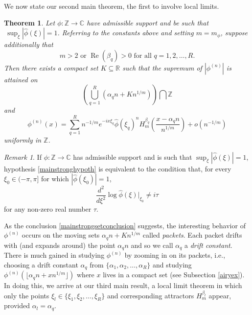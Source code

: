 \documentclass{article}
\theoremstyle{theorem}
\newtheorem{theorem}{Theorem}[section]
\theoremstyle{remark}
\newtheorem{remark}{Remark}
\renewcommand\Re{\operatorname{Re}}%
\begin{document}
\noindent We now state our second main theorem, the first to involve local limits.

\begin{theorem}\label{mainstrong}
Let $\phi:\mathbb{Z}\rightarrow \mathbb{C}$ have admissible support and be such
that $\ \sup_\xi|\hat\phi(\xi)|=1$. Referring to the constants above and setting $m=m_\phi$, suppose additionally that 
\begin{equation}\label{mainstronghypoth}
 m>2\mbox{ or }\Re(\beta_q)>0\mbox{ for all }q=1,2,\dots, R.
\end{equation}
Then there exists a compact set $K\subseteq\mathbb{R}$ such that the supremum of $|\phi^{(n)}|$ is attained on 
\begin{equation}\label{mainstrongsetconclusion}
\left(\bigcup_{q=1}^{R}(\alpha_q n+ Kn^{1/m})\right)\bigcap \mathbb{Z}
\end{equation}
 and
\begin{equation}\label{mainstrongconvergenceconclusion}
\phi^{(n)}(x)=\sum_{q=1}^{R}n^{-1/m}e^{-ix\xi_q}\hat{\phi}(\xi_q)^n H_m^{\beta_q}\left(\frac{x-\alpha_qn}{n^{1/m}}\right)+o(n^{-1/m})
\end{equation}  
uniformly in $\mathbb{Z}$.  
\end{theorem}

\begin{remark}
If $\phi:\mathbb{Z}\rightarrow\mathbb{C}$ has admissible support and is such that $\sup_\xi|\hat\phi(\xi)|=1$, hypothesis \eqref{mainstronghypoth} is equivalent to the condition that, for every $\xi_0\in(-\pi,\pi]$ for which $|\hat{\phi}(\xi_0)|=1$,
\begin{equation*}
\frac{d^2}{d\xi^2}\log\hat{\phi}(\xi)\Big|_{\xi_0}\neq i\tau
\end{equation*}
for any non-zero real number $\tau$. 
\end{remark}

\noindent As the conclusion \eqref{mainstrongsetconclusion} suggests, the interesting behavior of $\phi^{(n)}$ occurs on the moving sets $\alpha_q n+ Kn^{1/m}$ called \emph{packets}. Each packet drifts with (and expands around) the point $\alpha_q n$ and so we call $\alpha_q$ a \emph{drift constant}.  There is much gained in studying $\phi^{(n)}$ by zooming in on its  packets, i.e., choosing a drift constant $\alpha_q$ from $\{\alpha_1,\alpha_2,\dots,\alpha_R\}$ and studying $\phi^{(n)}(\lfloor\alpha_qn+xn^{1/m}\rfloor)$ where $x$ lives in a compact set (see Subsection \ref{airyex}). In doing this, we arrive at our third main result, a local limit theorem in which only the points $\xi_l\in\{\xi_1,\xi_2,\dots,\xi_R\}$ and corresponding attractors $H_m^{\beta_l}$ appear, provided $\alpha_l=\alpha_q$.  
\end{document}
